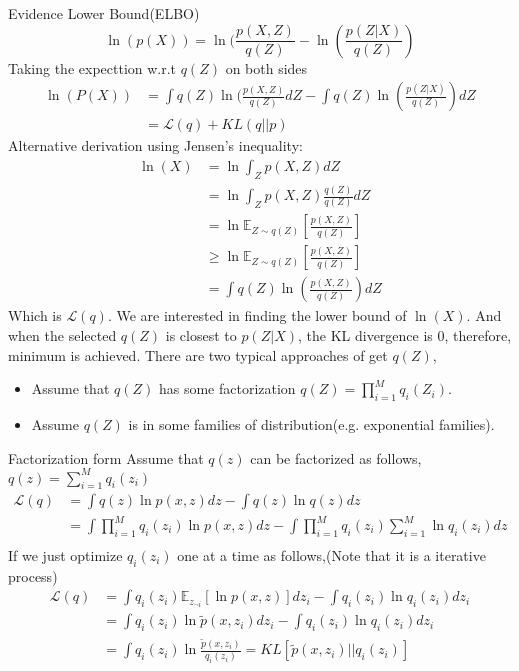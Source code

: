 
\begin{frame}[allowframebreaks]{Evidence Lower Bound(ELBO)}
    $$\ln (p(X)) = \ln (\frac{p(X,Z)}{q(Z)} - \ln (\frac{p(Z|X)}{q(Z)})$$
    Taking the expecttion w.r.t $q(Z)$ on both sides
    \begin{align*}
    \ln (P(X)) & = \int q(Z) \ln (\frac{p(X,Z)}{q(Z)} dZ - \int q(Z)\ln (\frac{p(Z|X)}{q(Z)}) dZ \\
    & = \mathcal{L}(q) + KL(q || p)
    \end{align*}
    Alternative derivation using Jensen's inequality:
    \begin{align*}
    \ln (X) & = \ln \int_Z p(X,Z) dZ \\
    & = \ln \int_Z p(X,Z) \frac{q(Z)}{q(Z)} dZ \\
    & = \ln \mathbb{E}_{Z \sim q(Z)} [\frac{p(X,Z)}{q(Z)}] \\
    & \ge \ln \mathbb{E}_{Z \sim q(Z)} [\frac{p(X,Z)}{q(Z)}] \\
    & = \int q(Z) \ln (\frac{p(X,Z)}{q(Z)}) dZ
    \end{align*}
    Which is $\mathcal{L}(q)$. We are interested in finding the lower bound of $\ln(X)$. And when the selected $q(Z)$ is closest to $p(Z|X)$, the KL divergence is 0, therefore, minimum is achieved.
    There are two typical approaches of get $q(Z)$,
    \begin{itemize}
    \item Assume that $q(Z)$ has some factorization $q(Z) = \prod_{i=1}^M q_i(Z_i)$.
    \item Assume $q(Z)$ is in some families of distribution(e.g. exponential families).
    \end{itemize}
    \end{frame}
    \begin{frame}{Factorization form}
    Assume that $q(z)$ can be factorized as follows, $q(z) = \sum_{i=1}^M q_i(z_i)$
    \begin{align*}
    \mathcal{L}(q) & = \int q(z) \ln p(x,z) dz - \int q(z) \ln q(z) dz \\
    & = \int \prod_{i=1}^M q_i(z_i) \ln p(x,z) dz - \int \prod_{i=1}^M q_i(z_i) \sum_{i=1}^M \ln q_i(z_i) dz \\
    \end{align*}
    If we just optimize $q_i(z_i)$ one at a time as follows,(Note that it is a iterative process)
    \begin{align*}
    \mathcal{L}(q) & = \int q_i(z_i)\mathbb{E}_{z_{\neg i}}[\ln p(x,z)]dz_i - \int q_i(z_i) \ln q_i(z_i) dz_i\\
    & = \int q_i(z_i)\ln \tilde{p}(x,z_i)dz_i - \int q_i(z_i) \ln q_i(z_i) dz_i \\
    & = \int q_i(z_i) \ln \frac{\tilde{p}(x,z_i)}{q_i(z_i)} = KL[\tilde{p}(x,z_i) || q_i(z_i)]
    \end{align*}
    \end{frame}
    
